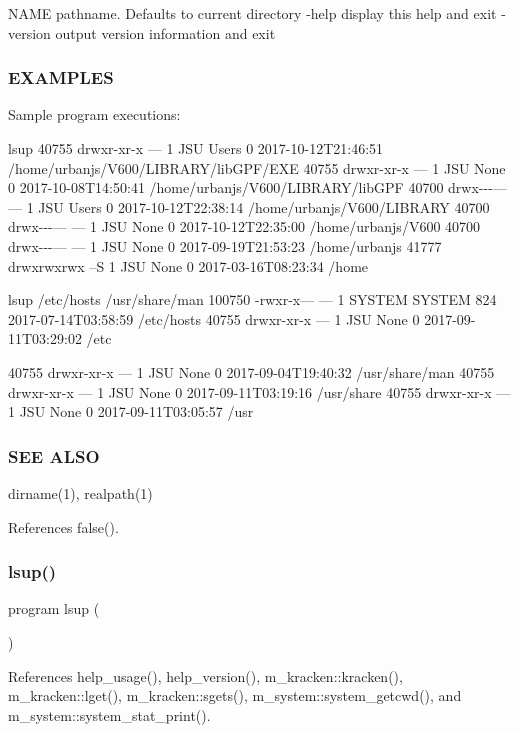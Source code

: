 N\+A\+ME pathname. Defaults to current directory -\/help display this help and exit -\/version output version information and exit

\subsubsection*{E\+X\+A\+M\+P\+L\+ES}

Sample program executions\+:

lsup 40755 drwxr-\/xr-\/x --- 1 J\+SU Users 0 2017-\/10-\/12\+T21\+:46\+:51 /home/urbanjs/\+V600/\+L\+I\+B\+R\+A\+R\+Y/lib\+G\+P\+F/\+E\+XE 40755 drwxr-\/xr-\/x --- 1 J\+SU None 0 2017-\/10-\/08\+T14\+:50\+:41 /home/urbanjs/\+V600/\+L\+I\+B\+R\+A\+R\+Y/lib\+G\+PF 40700 drwx-\/-\/-\/--- --- 1 J\+SU Users 0 2017-\/10-\/12\+T22\+:38\+:14 /home/urbanjs/\+V600/\+L\+I\+B\+R\+A\+RY 40700 drwx-\/-\/-\/--- --- 1 J\+SU None 0 2017-\/10-\/12\+T22\+:35\+:00 /home/urbanjs/\+V600 40700 drwx-\/-\/-\/--- --- 1 J\+SU None 0 2017-\/09-\/19\+T21\+:53\+:23 /home/urbanjs 41777 drwxrwxrwx --S 1 J\+SU None 0 2017-\/03-\/16\+T08\+:23\+:34 /home

lsup /etc/hosts /usr/share/man 100750 -\/rwxr-\/x--- --- 1 S\+Y\+S\+T\+EM S\+Y\+S\+T\+EM 824 2017-\/07-\/14\+T03\+:58\+:59 /etc/hosts 40755 drwxr-\/xr-\/x --- 1 J\+SU None 0 2017-\/09-\/11\+T03\+:29\+:02 /etc

40755 drwxr-\/xr-\/x --- 1 J\+SU None 0 2017-\/09-\/04\+T19\+:40\+:32 /usr/share/man 40755 drwxr-\/xr-\/x --- 1 J\+SU None 0 2017-\/09-\/11\+T03\+:19\+:16 /usr/share 40755 drwxr-\/xr-\/x --- 1 J\+SU None 0 2017-\/09-\/11\+T03\+:05\+:57 /usr

\subsubsection*{S\+EE A\+L\+SO}

dirname(1), realpath(1) 

References false().

\mbox{\label{lsup_8f90_a3c3d8a93f4c35d7c95cd6db2e692b561}} 
\subsubsection{\texorpdfstring{lsup()}{lsup()}}
{\footnotesize\ttfamily program lsup (\begin{DoxyParamCaption}{ }\end{DoxyParamCaption})}



References help\+\_\+usage(), help\+\_\+version(), m\+\_\+kracken\+::kracken(), m\+\_\+kracken\+::lget(), m\+\_\+kracken\+::sgets(), m\+\_\+system\+::system\+\_\+getcwd(), and m\+\_\+system\+::system\+\_\+stat\+\_\+print().

